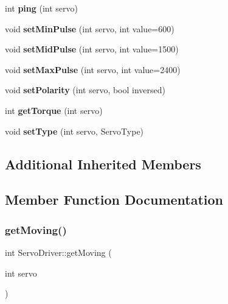 \begin{DoxyCompactItemize}
int {\bfseries ping} (int servo)
\item 
\mbox{\label{classServoDriver_a40ec259cb0ced3154b1e73cc52d48938}} 
void {\bfseries set\+Min\+Pulse} (int servo, int value=600)
\item 
\mbox{\label{classServoDriver_a92d53f7f50a7eb95e14ae358ad0b7d23}} 
void {\bfseries set\+Mid\+Pulse} (int servo, int value=1500)
\item 
\mbox{\label{classServoDriver_aaaeaab97cef5c2ebcd05c265fdff747f}} 
void {\bfseries set\+Max\+Pulse} (int servo, int value=2400)
\item 
\mbox{\label{classServoDriver_a89b2add38109f20260369e0a0d747bf2}} 
void {\bfseries set\+Polarity} (int servo, bool inversed)
\item 
\mbox{\label{classServoDriver_a108cce4f0dcf60bf443ee932621bc89c}} 
int {\bfseries get\+Torque} (int servo)
\item 
\mbox{\label{classServoDriver_a5ca0f58290fa29ae484fe4a5077a1c8e}} 
void {\bfseries set\+Type} (int servo, Servo\+Type)
\end{DoxyCompactItemize}
\subsection*{Additional Inherited Members}


\subsection{Member Function Documentation}
\mbox{\label{classServoDriver_a0a8e84f0bbcff39549ddfc239f1a6237}} 
\subsubsection{\texorpdfstring{get\+Moving()}{getMoving()}\hspace{0.1cm}{\footnotesize\ttfamily [1/6]}}
{\footnotesize\ttfamily int Servo\+Driver\+::get\+Moving (\begin{DoxyParamCaption}\item[{int}]{servo }\end{DoxyParamCaption})\hspace{0.3cm}{\ttfamily [virtual]}}



